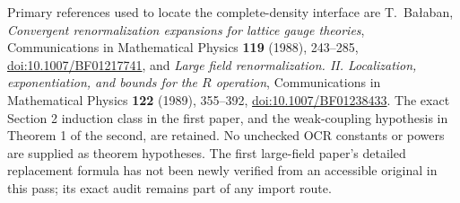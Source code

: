 Primary references used to locate the complete-density interface are
T.~Ba{\l}aban, \emph{Convergent renormalization expansions for lattice
gauge theories}, Communications in Mathematical Physics
\textbf{119} (1988), 243--285,
\href{https://doi.org/10.1007/BF01217741}{doi:10.1007/BF01217741},
and \emph{Large field renormalization. II. Localization,
exponentiation, and bounds for the \(R\) operation},
Communications in Mathematical Physics \textbf{122} (1989),
355--392,
\href{https://doi.org/10.1007/BF01238433}{doi:10.1007/BF01238433}.
The exact Section 2 induction class in the first paper, and the
weak-coupling hypothesis in Theorem 1 of the second, are retained.
No unchecked OCR constants or powers are supplied as theorem
hypotheses. The first large-field paper's detailed replacement
formula has not been newly verified from an accessible original
in this pass; its exact audit remains part of any import route.


